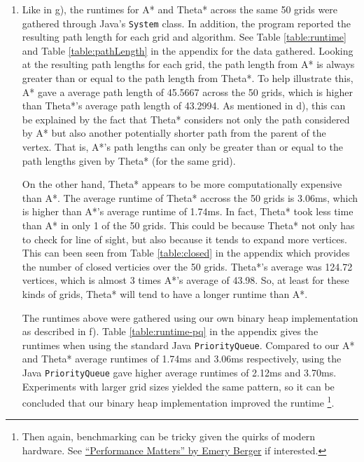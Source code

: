 \documentclass[12pt]{article}
\begin{document}
\begin{enumerate}[label={\large\textbf{\alph*)}}]
\item
Like in g), the runtimes for A* and Theta* across the same 50 grids
were gathered through Java's \verb|System| class.
In addition, the program reported the resulting path length for each grid and algorithm.
See Table \ref{table:runtime} and Table \ref{table:pathLength} in the appendix for the data gathered.
Looking at the resulting path lengths for each grid,
the path length from A* is always greater than or equal to the path length from Theta*.
To help illustrate this, A* gave a average path length of 45.5667 across the 50 grids,
which is higher than Theta*'s average path length of 43.2994.
As mentioned in d), this can be explained by the fact that Theta* considers not only the path considered by A*
but also another potentially shorter path from the parent of the vertex.
That is, A*'s path lengths can only be greater than or equal to the path lengths given by Theta* (for the same grid).

On the other hand, Theta* appears to be more computationally expensive than A*.
The average runtime of Theta* accross the 50 grids is 3.06ms,
which is higher than A*'s average runtime of 1.74ms.
In fact, Theta* took less time than A* in only 1 of the 50 grids.
This could be because Theta* not only has to check for line of sight,
but also because it tends to expand more vertices.
This can been seen from Table \ref{table:closed} in the appendix
which provides the number of closed verticies over the 50 grids.
Theta*'s average was 124.72 vertices,
which is almost 3 times A*'s average of 43.98.
So, at least for these kinds of grids,
Theta* will tend to have a longer runtime than A*.

The runtimes above were gathered using our own binary heap implementation as described in f).
Table \ref{table:runtime-pq} in the appendix gives the runtimes when using the standard Java \verb|PriorityQueue|.
Compared to our A* and Theta* average runtimes of 1.74ms and 3.06ms respectively,
using the Java \verb|PriorityQueue| gave higher average runtimes of 2.12ms and 3.70ms.
Experiments with larger grid sizes yielded the same pattern,
so it can be concluded that our binary heap implementation improved the runtime
\footnote{Then again, benchmarking can be tricky given the quirks of modern hardware.
See \href{https://youtu.be/r-TLSBdHe1A?t=687}{``Performance Matters'' by Emery Berger} if interested.}.


\end{enumerate}
\end{document}
